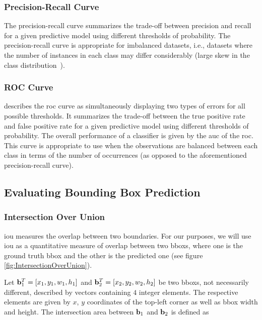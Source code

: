 \subsubsection{Precision-Recall Curve}
\label{sssec:PrecisionRecallCurve}

The precision-recall curve summarizes the trade-off between precision and recall for a given predictive model using different thresholds of probability. The precision-recall curve is appropriate for imbalanced datasets, i.e., datasets where the number of instances in each class may differ considerably (large skew in the class distribution~\cite{Davis2016}).

\subsubsection{ROC Curve}

\cite{James2013} describes the \gls{roc} curve as simultaneously displaying two types of errors for all possible thresholds. It summarizes the trade-off between the true positive rate and false positive rate for a given predictive model using different thresholds of probability. The overall performance of a classifier is given by the \gls{auc} of the \gls{roc}. This curve is appropriate to use when the observations are balanced between each class in terms of the number of occurrences (as opposed to the aforementioned precision-recall curve).

\subsection{Evaluating Bounding Box Prediction}
\label{ssec:EvaluatingBoundingBoxPrediction}

\subsubsection{Intersection Over Union}
\label{sssec:IntersectionOverUnion}

\Gls{iou} measures the overlap between two boundaries. For our purposes, we will use \gls{iou} as a quantitative measure of overlap between two \glspl{bbox}, where one is the ground truth \gls{bbox} and the other is the predicted one (see figure \ref{fig:IntersectionOverUnion}).

Let ${\mathbf{b}}_{1}^{T} = \left[ {x_1, y_1, w_1, h_1} \right]$ and ${\mathbf{b}}_{2}^{T} = \left[ {x_2, y_2, w_2, h_2} \right]$ be two \glspl{bbox}, not necessarily different, described by vectors containing $4$ integer elements. The respective elements are given by $x$, $y$ coordinates of the top-left corner as well as \gls{bbox} width and height. The intersection area between $\mathbf{b}_1$ and $\mathbf{b}_2$ is defined as

